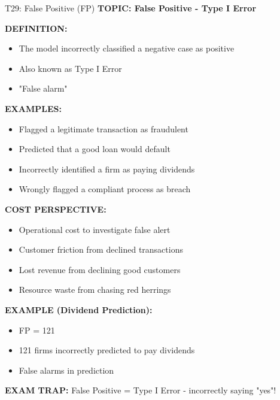 \documentclass[8pt]{beamer}
\begin{document}
	\begin{frame}{T29: False Positive (FP)}
		\fontsize{6.5}{7.5}\selectfont
		\textbf{TOPIC: False Positive - Type I Error}
		
		\vspace{0.1cm}
		\textbf{DEFINITION:}
		\begin{itemize}
			\item The model incorrectly classified a negative case as positive
			\item Also known as Type I Error
			\item "False alarm"
		\end{itemize}
		
		\vspace{0.1cm}
		\textbf{EXAMPLES:}
		\begin{itemize}
			\item Flagged a legitimate transaction as fraudulent
			\item Predicted that a good loan would default
			\item Incorrectly identified a firm as paying dividends
			\item Wrongly flagged a compliant process as breach
		\end{itemize}
		
		\vspace{0.1cm}
		\textbf{COST PERSPECTIVE:}
		\begin{itemize}
			\item Operational cost to investigate false alert
			\item Customer friction from declined transactions
			\item Lost revenue from declining good customers
			\item Resource waste from chasing red herrings
		\end{itemize}
		
		\vspace{0.1cm}
		\textbf{EXAMPLE (Dividend Prediction):}
		\begin{itemize}
			\item FP = 121
			\item 121 firms incorrectly predicted to pay dividends
			\item False alarms in prediction
		\end{itemize}
		
		\textcolor{myred}{\textbf{EXAM TRAP:}} False Positive = \textcolor{myblue}{Type I Error} - incorrectly saying "yes"!
	\end{frame}
	
\end{document}

